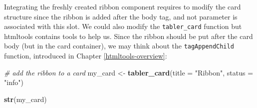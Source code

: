 \documentclass[
]{book}
\newenvironment{Shaded}{\begin{snugshade}}{\end{snugshade}}
\newcommand{\CommentTok}[1]{\textcolor[rgb]{0.56,0.35,0.01}{\textit{#1}}}
\newcommand{\ControlFlowTok}[1]{\textcolor[rgb]{0.13,0.29,0.53}{\textbf{#1}}}
\newcommand{\DataTypeTok}[1]{\textcolor[rgb]{0.13,0.29,0.53}{#1}}
\newcommand{\KeywordTok}[1]{\textcolor[rgb]{0.13,0.29,0.53}{\textbf{#1}}}
\newcommand{\NormalTok}[1]{#1}
\newcommand{\OperatorTok}[1]{\textcolor[rgb]{0.81,0.36,0.00}{\textbf{#1}}}
\newcommand{\OtherTok}[1]{\textcolor[rgb]{0.56,0.35,0.01}{#1}}
\newcommand{\StringTok}[1]{\textcolor[rgb]{0.31,0.60,0.02}{#1}}
\begin{document}
\begin{Shaded}
\end{Shaded}

Integrating the freshly created ribbon component requires to modify the card structure since the ribbon is added after the body tag, and not parameter is associated with this slot. We could also modify the \texttt{tabler\_card} function but htmltools contains tools to help us. Since the ribbon should be put after the card body (but in the card container), we may think about the \texttt{tagAppendChild} function, introduced in Chapter \ref{htmltools-overview}:

\begin{Shaded}
\begin{Highlighting}[]
\CommentTok{# add the ribbon to a card}
\NormalTok{my_card <-}\StringTok{ }\KeywordTok{tabler_card}\NormalTok{(}\DataTypeTok{title =} \StringTok{"Ribbon"}\NormalTok{, }\DataTypeTok{status =} \StringTok{"info"}\NormalTok{)}

\KeywordTok{str}\NormalTok{(my_card)}
\end{Highlighting}
\end{Shaded}
\end{document}
